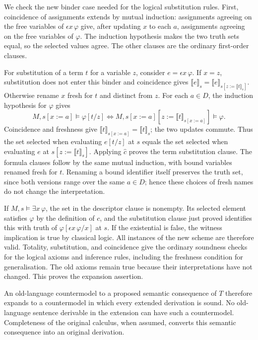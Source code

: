 We check the new binder case needed for the logical substitution rules.
First, coincidence of assignments extends by mutual induction: assignments
agreeing on the free variables of $\epsilon x\,\varphi$ give, after
updating $x$ to each $a$, assignments agreeing on the free variables of
$\varphi$. The induction hypothesis makes the two truth sets equal,
so the selected values agree. The other clauses are the ordinary
first-order clauses.

For substitution of a term $t$ for a variable $z$, consider
$e=\epsilon x\,\varphi$. If $x=z$, substitution does not enter this
binder and coincidence gives
$\llbracket e\rrbracket_s=
\llbracket e\rrbracket_{s[z:=\llbracket t\rrbracket_s]}$.
Otherwise rename $x$ fresh for $t$ and distinct from $z$. For each
$a\in D$, the induction hypothesis for $\varphi$ gives
\[
M,s[x:=a]\models\varphi[t/z]
\iff
M,s[x:=a][z:=\llbracket t\rrbracket_{s[x:=a]}]\models\varphi.
\]
Coincidence and freshness give
$\llbracket t\rrbracket_{s[x:=a]}=\llbracket t\rrbracket_s$;
the two updates commute. Thus the set selected when evaluating $e[t/z]$
at $s$ equals the set selected when evaluating $e$ at
$s[z:=\llbracket t\rrbracket_s]$. Applying $\widehat c$ proves the
term substitution clause. The formula clauses follow by the same mutual
induction, with bound variables renamed fresh for $t$. Renaming a bound
identifier itself preserves the truth set, since both versions range
over the same $a\in D$; hence these choices of fresh names do not
change the interpretation.

If $M,s\models\exists x\,\varphi$, the set in the descriptor clause
is nonempty. Its selected element satisfies $\varphi$ by the definition
of $c$, and the substitution clause just proved identifies this with
truth of $\varphi[\epsilon x\,\varphi/x]$ at $s$. If the existential
is false, the witness implication is true by classical logic. All
instances of the new scheme are therefore valid. Totality, substitution,
and coincidence give the ordinary soundness checks for the logical
axioms and inference rules, including the freshness condition for
generalisation. The old axioms remain true because their interpretations
have not changed. This proves the expansion assertion.

An old-language countermodel to a proposed semantic consequence of $T$
therefore expands to a countermodel in which every extended derivation
is sound. No old-language sentence derivable in the extension can have
such a countermodel. Completeness of the original calculus, when assumed,
converts this semantic consequence into an original derivation.
\Done

